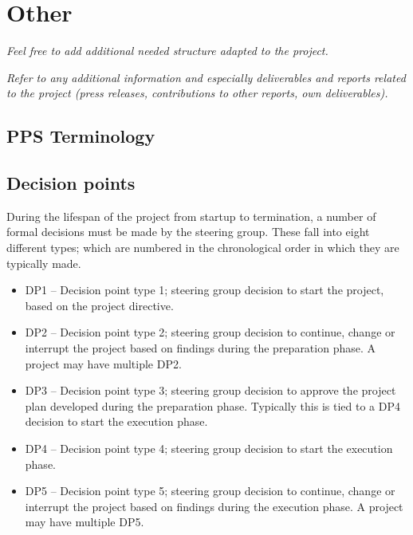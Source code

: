\documentclass{article}
\begin{document}
\section{Other}

{\it Feel free to add additional needed structure adapted to the project.}

\newpage
{\it Refer to any additional information and especially deliverables and reports related to the project (press releases, contributions to other reports, own deliverables).}
{}


\newpage
\begin{appendices}
\section{PPS Terminology}

\subsection{Decision points}
During the lifespan of the project from startup to termination, a number of formal decisions must be made by the steering group. These fall into eight different types; which are numbered in the chronological order in which they are typically made.
\begin{itemize}

\item DP1 – Decision point type 1; steering group decision to start the project, based on the project directive.

\item DP2 – Decision point type 2; steering group decision to continue, change or interrupt the project based on findings during the preparation phase. A project may have multiple DP2.

\item DP3 – Decision point type 3; steering group decision to approve the project plan developed during the preparation phase. Typically this is tied to a DP4 decision to start the execution phase.

\item DP4 – Decision point type 4; steering group decision to start the execution phase.

\item DP5 – Decision point type 5; steering group decision to continue, change or interrupt the project based on findings during the execution phase. A project may have multiple DP5.


\end{itemize}
\end{appendices}
\end{document}
